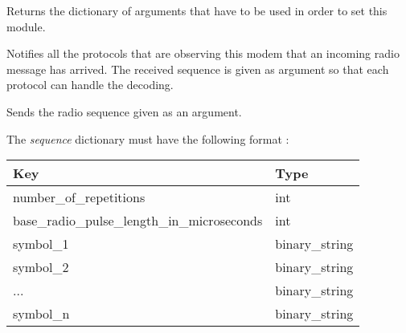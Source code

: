 \documentclass[letterpaper,10pt,english]{sphinxmanual}
\begin{document}
\begin{fulllineitems}

\begin{fulllineitems}
\label{implementation_examples:drivers.arduino_radio.ArduinoRadio.get_set_arguments}
Returns the dictionary of arguments that
have to be used in order to set this module.

\end{fulllineitems}


\begin{fulllineitems}
\label{implementation_examples:drivers.arduino_radio.ArduinoRadio.notify_observers}
Notifies all the protocols that are observing this
modem that an incoming radio message has arrived.
The received sequence is given as argument so that each
protocol can handle the decoding.

\end{fulllineitems}


\begin{fulllineitems}
\label{implementation_examples:drivers.arduino_radio.ArduinoRadio.send_sequence}
Sends the radio sequence given as an argument.

The \emph{sequence} dictionary must have the following format :

\begin{tabulary}{\linewidth}{|L|L|}
\hline
\textsf{\relax 
Key
} & \textsf{\relax 
Type
}\\
\hline
number\_of\_repetitions
 & 
int
\\

base\_radio\_pulse\_length\_in\_microseconds
 & 
int
\\

symbol\_1
 & 
binary\_string
\\

symbol\_2
 & 
binary\_string
\\

...
 & 
binary\_string
\\

symbol\_n
 & 
binary\_string
\\


\end{tabulary}
\end{fulllineitems}
\end{fulllineitems}
\end{document}
